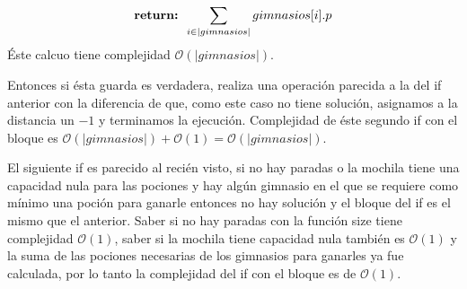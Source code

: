 \[
	\text{\textbf{return: }} \sum_{i \in |gimnasios|} gimnasios[i].p
\]
Éste calcuo tiene complejidad $\mathcal{O}(|gimnasios|)$.

Entonces si ésta guarda es verdadera, realiza una operación parecida a la del if anterior con la diferencia de que, como este caso no tiene solución, asignamos a la distancia un $-1$ y terminamos la ejecución. Complejidad de éste segundo if con el bloque es $\mathcal{O}(|gimnasios|) + \mathcal{O}(1) = \mathcal{O}(|gimnasios|)$.

El siguiente if es parecido al recién visto, si no hay paradas o la mochila tiene una capacidad nula para las pociones y hay algún gimnasio en el que se requiere como mínimo una poción para ganarle entonces no hay solución y el bloque del if es el mismo que el anterior. Saber si no hay paradas con la función size tiene complejidad $\mathcal{O}(1)$, saber si la mochila tiene capacidad nula también es $\mathcal{O}(1)$ y la suma de las pociones necesarias de los gimnasios para ganarles ya fue calculada, por lo tanto la complejidad del if con el bloque es de $\mathcal{O}(1)$.









